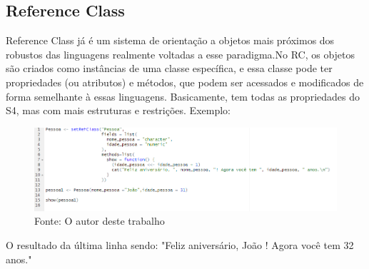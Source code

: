 	\subsection{Reference Class}
		Reference Class já é um sistema de orientação a objetos mais próximos dos robustos das linguagens realmente voltadas a esse paradigma.No RC, os objetos são criados como instâncias de uma classe específica, e essa classe pode ter propriedades (ou atributos) e métodos, que podem ser acessados e modificados de forma semelhante à essas linguagens. Basicamente, tem todas as propriedades do S4, mas com mais estruturas e restrições. Exemplo:\begin{figure}[H]
			\centering
			\caption{}
			\includegraphics[width=1.0\linewidth]{Prints/screenshot016}
			\label{fig:screenshot016}
			{\tiny \sf Fonte: O autor deste trabalho }
		\end{figure}
		O resultado da última linha sendo: "Feliz aniversário,  João ! Agora você tem  32  anos."
		
